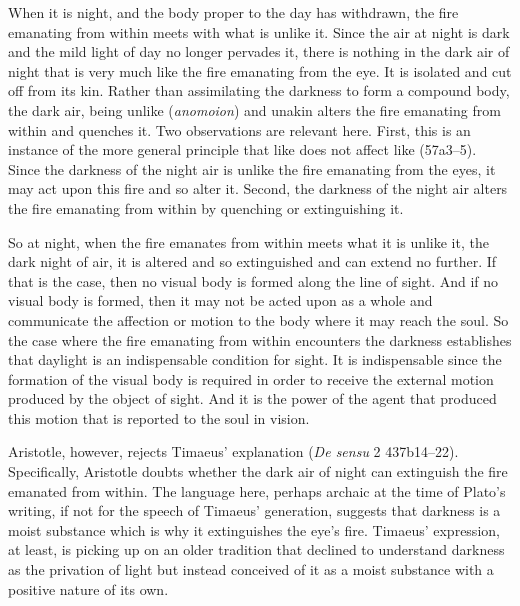 When it is night, and the body proper to the day has withdrawn, the fire emanating from within meets with what is unlike it. Since the air at night is dark and the mild light of day no longer pervades it, there is nothing in the dark air of night that is very much like the fire emanating from the eye. It is isolated and cut off from its kin. Rather than assimilating the darkness to form a compound body, the dark air, being unlike (\emph{anomoion}) and unakin alters the fire emanating from within and quenches it. Two observations are relevant here. First, this is an instance of the more general principle that like does not affect like (57a3--5). Since the darkness of the night air is unlike the fire emanating from the eyes, it may act upon this fire and so alter it. Second, the darkness of the night air alters the fire emanating from within by quenching or extinguishing it.

So at night, when the fire emanates from within meets what it is unlike it, the dark night of air, it is altered and so extinguished and can extend no further. If that is the case, then no visual body is formed along the line of sight. And if no visual body is formed, then it may not be acted upon as a whole and communicate the affection or motion to the body where it may reach the soul. So the case where the fire emanating from within encounters the darkness establishes that daylight is an indispensable condition for sight. It is indispensable since the formation of the visual body is required in order to receive the external motion produced by the object of sight. And it is the power of the agent that produced this motion that is reported to the soul in vision.

Aristotle, however, rejects Timaeus' explanation (\emph{De sensu} 2 437b14--22). Specifically, Aristotle doubts whe\-ther the dark air of night can extinguish the fire emanated from within. The language here, perhaps archaic at the time of Plato's writing, if not for the speech of Timaeus' generation, suggests that darkness is a moist substance which is why it extinguishes the eye's fire. Timaeus' expression, at least, is picking up on an older tradition that declined to understand darkness as the privation of light but instead conceived of it as a moist substance with a positive nature of its own.

